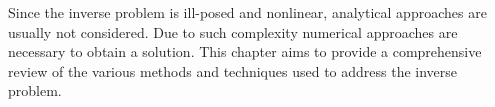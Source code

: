 	
	Since the inverse problem is ill-posed and nonlinear, analytical approaches are usually not considered. Due to such complexity numerical approaches are necessary to obtain a solution. This chapter aims to provide a comprehensive review of the various methods and techniques used to address the inverse problem.
	
